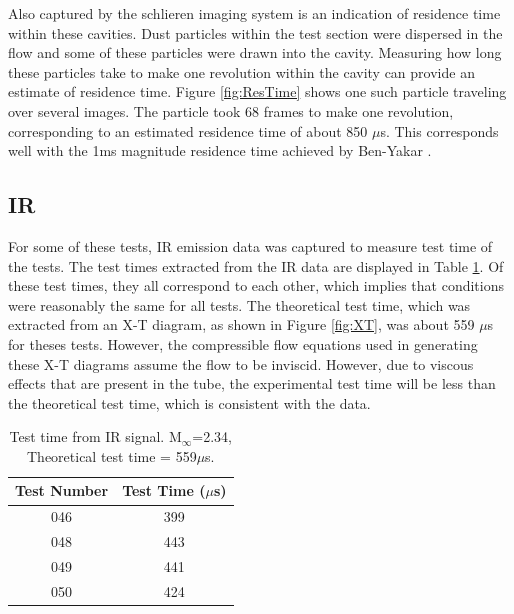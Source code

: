 Also captured by the schlieren imaging system is an indication of residence time within these cavities. Dust particles within the test section were dispersed in the flow and some of these particles were drawn into the cavity. Measuring how long these particles take to make one revolution within the cavity can provide an estimate of residence time. Figure \ref{fig:ResTime} shows one such particle traveling over several images. The particle took 68 frames to make one revolution, corresponding to an estimated residence time of about 850 $\mu$s. This corresponds well with the 1ms magnitude residence time achieved by Ben-Yakar \cite{ben2001cavity}.


\subsection{IR}

For some of these tests, IR emission data was captured to measure test time of the tests. The test times extracted from the IR data are displayed in Table \ref{Table:IRtest}. Of these test times, they all correspond to each other, which implies that conditions were reasonably the same for all tests. The theoretical test time, which was extracted from an X-T diagram, as shown in Figure \ref{fig:XT}, was about 559 $\mu$s for theses tests. However, the compressible flow equations used in generating these X-T diagrams assume the flow to be inviscid. However, due to viscous effects that are present in the tube, the experimental test time will be less than the theoretical test time, which is consistent with the data.

\begin{table}[]
\centering
\caption[Test time calculated with IR signal]{Test time from IR signal. M$_\infty$=2.34, Theoretical test time = 559$\mu$s.}
\label{Table:IRtest}
\begin{tabular}{c|c}

Test Number & Test Time ($\mu$s) \\ \hline
046         & 399                      \\ 
048         & 443                      \\ 
049         & 441                      \\ 
050         & 424                      \\ 
\end{tabular}
\end{table}

